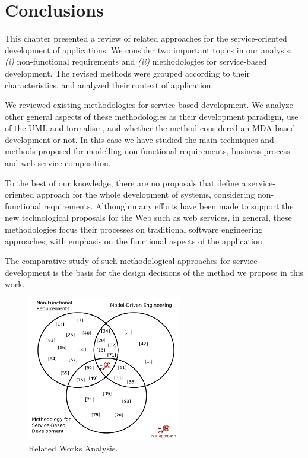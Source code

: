 \section{Conclusions}
\label{sec:stateofart_conclusion}


This chapter presented a review of related approaches for the
service-oriented development of applications. We consider two important
topics in our analysis: \textit{(i)} non-functional requirements and
\textit{(ii)} methodologies for service-based development. The revised methods
were grouped according to their characteristics, and analyzed their context
of application.
 

We reviewed existing methodologies for service-based development. We
analyze other general aspects of these methodologies as their
development paradigm, use of the UML and formalism, and whether the method
considered an MDA-based development or not. In this case we have studied the main techniques
and methods proposed for modelling non-functional requirements,
business process and web service composition.
% 

To the best of our knowledge, there are no proposals that define a
service-oriented approach for the whole development of systems, considering
non-functional requirements. Although many efforts have been made to support the new
technological proposals for the Web such as web services, in general, these
methodologies focus their processes on traditional software
engineering approaches, with emphasis on the functional aspects of the
application.

The comparative study of such methodological approaches for service development
is the basis for the design decisions of the method we propose in
this work.
 
\begin{figure}  [ht!]
\centering  
\includegraphics[width=0.6\textwidth]{chapters/state_ofthe_art/figs/ourApproach.pdf}
\caption{Related Works Analysis.}
\label{fig:ourApproach}   
\end{figure}  
 
